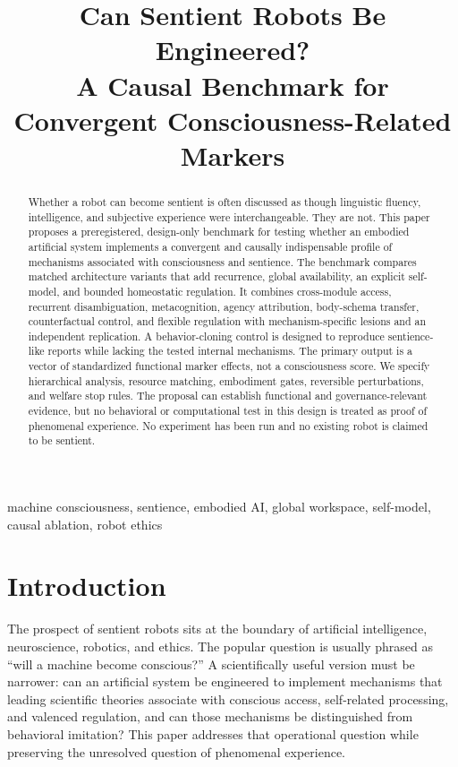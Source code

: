\documentclass[conference]{IEEEtran}
\title{Can Sentient Robots Be Engineered?\\
A Causal Benchmark for Convergent Consciousness-Related Markers}
\author{\IEEEauthorblockN{Xcientist Research Team}
\IEEEauthorblockA{Interdisciplinary Artificial Intelligence Research\\
Design-only research report\\
September 2026}}
\begin{document}
\maketitle

\begin{abstract}
Whether a robot can become sentient is often discussed as though linguistic fluency, intelligence, and subjective experience were interchangeable. They are not. This paper proposes a preregistered, design-only benchmark for testing whether an embodied artificial system implements a convergent and causally indispensable profile of mechanisms associated with consciousness and sentience. The benchmark compares matched architecture variants that add recurrence, global availability, an explicit self-model, and bounded homeostatic regulation. It combines cross-module access, recurrent disambiguation, metacognition, agency attribution, body-schema transfer, counterfactual control, and flexible regulation with mechanism-specific lesions and an independent replication. A behavior-cloning control is designed to reproduce sentience-like reports while lacking the tested internal mechanisms. The primary output is a vector of standardized functional marker effects, not a consciousness score. We specify hierarchical analysis, resource matching, embodiment gates, reversible perturbations, and welfare stop rules. The proposal can establish functional and governance-relevant evidence, but no behavioral or computational test in this design is treated as proof of phenomenal experience. No experiment has been run and no existing robot is claimed to be sentient.
\end{abstract}

\begin{IEEEkeywords}
machine consciousness, sentience, embodied AI, global workspace, self-model, causal ablation, robot ethics
\end{IEEEkeywords}

\section{Introduction}

The prospect of sentient robots sits at the boundary of artificial intelligence, neuroscience, robotics, and ethics. The popular question is usually phrased as ``will a machine become conscious?'' A scientifically useful version must be narrower: can an artificial system be engineered to implement mechanisms that leading scientific theories associate with conscious access, self-related processing, and valenced regulation, and can those mechanisms be distinguished from behavioral imitation? This paper addresses that operational question while preserving the unresolved question of phenomenal experience.
\end{document}
